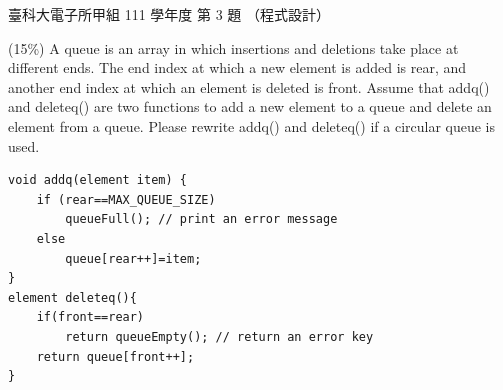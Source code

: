 \begin{pastexam}[label={px:ntust-111-et-ds-03}]{臺科大電子所甲組 111 學年度 第 3 題}
（程式設計）

(15\%) A queue is an array in which insertions and deletions take place at different ends. The end
index at which a new element is added is rear, and another end index at which an element is deleted
is front. Assume that addq() and deleteq() are two functions to add a new element to a queue and
delete an element from a queue. Please rewrite addq() and deleteq() if a circular queue is used.
\begin{verbatim}
void addq(element item) {
    if (rear==MAX_QUEUE_SIZE)
        queueFull(); // print an error message
    else
        queue[rear++]=item;
}
element deleteq(){
    if(front==rear)
        return queueEmpty(); // return an error key
    return queue[front++];
}
\end{verbatim}
\end{pastexam}

